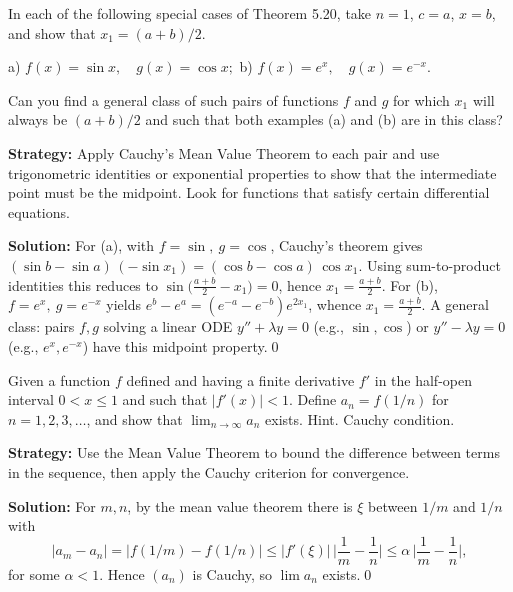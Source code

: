 \begin{problembox}
\begin{problemstatement}
In each of the following special cases of Theorem 5.20, take \( n = 1 \), \( c = a \), \( x = b \), and show that \( x_1 = (a + b)/2 \).

a) \( f(x) = \sin x, \quad g(x) = \cos x; \) 
b) \( f(x) = e^x, \quad g(x) = e^{-x} \).

Can you find a general class of such pairs of functions \( f \) and \( g \) for which \( x_1 \) will always be \( (a + b)/2 \) and such that both examples (a) and (b) are in this class?
\end{problemstatement}
\end{problembox}

\noindent\textbf{Strategy:} Apply Cauchy's Mean Value Theorem to each pair and use trigonometric identities or exponential properties to show that the intermediate point must be the midpoint. Look for functions that satisfy certain differential equations.

\bigskip\noindent\textbf{Solution:}
For (a), with $f=\sin,\ g=\cos$, Cauchy's theorem gives $(\sin b-\sin a)\,(-\sin x_1)=(\cos b-\cos a)\,\cos x_1$. Using sum-to-product identities this reduces to $\sin\big(\tfrac{a+b}{2}-x_1\big)=0$, hence $x_1=\tfrac{a+b}{2}$. For (b), $f=e^x,\ g=e^{-x}$ yields $e^b-e^a=(e^{-a}-e^{-b})e^{2x_1}$, whence $x_1=\tfrac{a+b}{2}$. A general class: pairs $f,g$ solving a linear ODE $y''+\lambda y=0$ (e.g., $\sin,\cos$) or $y''-\lambda y=0$ (e.g., $e^x,e^{-x}$) have this midpoint property.\qed


\begin{problembox}
\begin{problemstatement}
Given a function \( f \) defined and having a finite derivative \( f' \) in the half-open interval \( 0 < x \leq 1 \) and such that \( |f'(x)| < 1 \). Define \( a_n = f(1/n) \) for \( n = 1, 2, 3, \ldots \), and show that \( \lim_{n \to \infty} a_n \) exists. Hint. Cauchy condition.
\end{problemstatement}
\end{problembox}

\noindent\textbf{Strategy:} Use the Mean Value Theorem to bound the difference between terms in the sequence, then apply the Cauchy criterion for convergence.

\bigskip\noindent\textbf{Solution:}
For $m,n$, by the mean value theorem there is $\xi$ between $1/m$ and $1/n$ with
\[|a_m-a_n|=|f(1/m)-f(1/n)|\le |f'(\xi)|\,\Big|\frac1m-\frac1n\Big|\le \alpha\,\Big|\frac1m-\frac1n\Big|,\]
for some $\alpha<1$. Hence $(a_n)$ is Cauchy, so $\lim a_n$ exists.\qed


